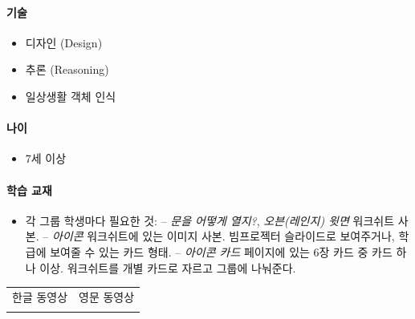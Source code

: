 \documentclass[]{article}
\begin{document}
\mbox{}\paragraph{기술}\label{section-260}

\begin{itemize}
\itemsep1pt\parskip0pt
\item
  디자인 (Design)
\item
  추론 (Reasoning)
\item
  일상생활 객체 인식
\end{itemize}

\mbox{}\paragraph{나이}\label{section-261}

\begin{itemize}
\itemsep1pt\parskip0pt
\item
  7세 이상
\end{itemize}

\mbox{}\paragraph{학습 교재}\label{section-262}

\begin{itemize}
\itemsep1pt\parskip0pt
\item
  각 그룹 학생마다 필요한 것: -- \emph{문을 어떻게 열지?},
  \emph{오븐(레인지) 윗면} 워크쉬트 사본. -- \emph{아이콘} 워크쉬트에
  있는 이미지 사본. 빔프로젝터 슬라이드로 보여주거나, 학급에 보여줄 수
  있는 카드 형태. -- \emph{아이콘 카드} 페이지에 있는 6장 카드 중 카드
  하나 이상. 워크쉬트를 개별 카드로 자르고 그룹에 나눠준다.
\end{itemize}


\begin{longtable}[c]{@{}ll@{}}
\toprule
\begin{minipage}[t]{0.47\columnwidth}\raggedright\strut
한글 동영상
\strut\end{minipage} &
\begin{minipage}[t]{0.47\columnwidth}\raggedright\strut
영문 동영상
\strut\end{minipage}\tabularnewline
\begin{minipage}[t]{0.47\columnwidth}\raggedright\strut
\strut\end{minipage} &
\begin{minipage}[t]{0.47\columnwidth}\raggedright\strut
\strut\end{minipage}\tabularnewline
\bottomrule
\end{longtable}
\end{document}
